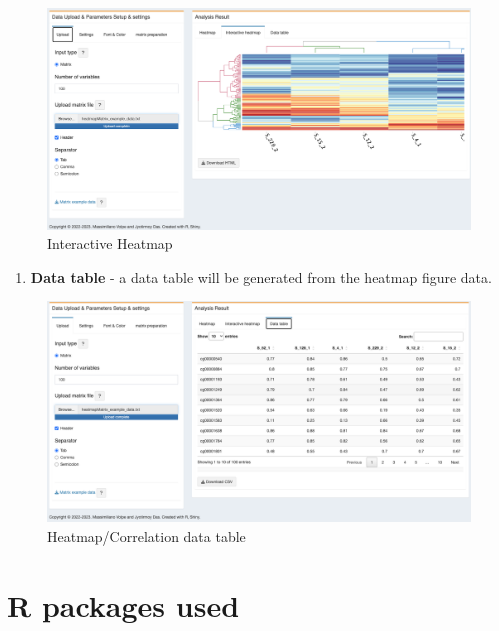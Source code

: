\documentclass[
  a4paper,
  oneside,
  open=any]{scrreport}
\providecommand{\tightlist}{%
  \setlength{\itemsep}{0pt}\setlength{\parskip}{0pt}}\usepackage{longtable,booktabs,array}
\begin{document}
\begin{figure}[H]

{\centering \includegraphics{./_images/heatmap2.png}

}

\caption{Interactive Heatmap}

\end{figure}

\begin{enumerate}
\def\labelenumi{\arabic{enumi}.}
\setcounter{enumi}{2}
\tightlist
\item
  \textbf{Data table} - a data table will be generated from the heatmap
  figure data.
\end{enumerate}

\begin{figure}[H]

{\centering \includegraphics{./_images/heatmap-datatable.png}

}

\caption{Heatmap/Correlation data table}

\end{figure}

\hypertarget{r-packages-used-2}{%
\section{R packages used}\label{r-packages-used-2}}
\end{document}
